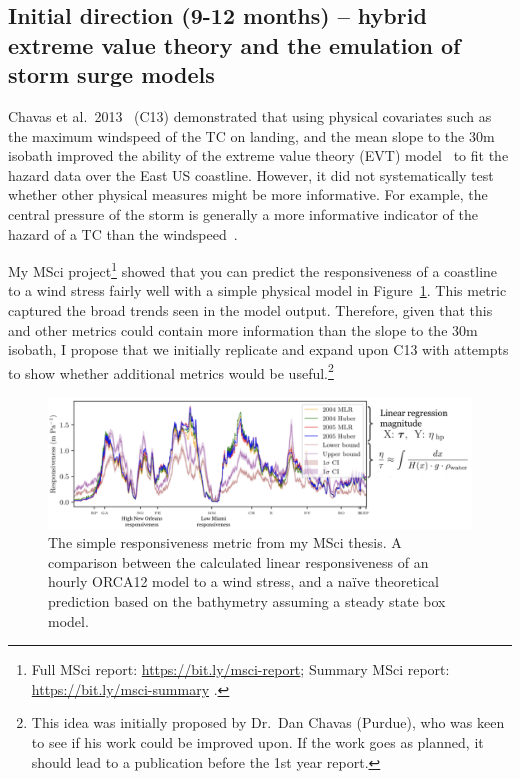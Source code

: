 \documentclass[usenames, dvipsnames]{article}      %
\begin{document}
\subsection*{Initial direction (9-12 months) -- hybrid extreme value theory 
            and the emulation of storm surge models}

\vspace{-10pt}
Chavas et al.~2013~\cite{Chavas2013U.S.Perspective} (C13)
demonstrated that using physical covariates such as
the maximum windspeed of the TC on landing,
and the mean slope to the 30m isobath improved the ability
of the extreme value theory (EVT) model~\cite{coles2001introduction}
to fit the hazard data over the East US coastline.
However, it did not systematically test whether
other physical measures might be more informative.
For example, the central pressure of the storm is generally
a more informative indicator of the hazard of a TC than the windspeed~\cite{Chavas2017PhysicalRelationship}.

 My MSci project\footnote{
 Full MSci report: \url{https://bit.ly/msci-report}; 
 Summary MSci report: \url{https://bit.ly/msci-summary}
 .} 
 showed that you can predict the
 responsiveness of a coastline to a wind stress fairly well with a
 simple physical model in Figure~\ref{fig:responsiveness}.
 This metric captured the broad trends seen in the model output.
 Therefore, given that this and other metrics could contain more
 information than the slope to the 30m isobath, I propose that we
 initially replicate and expand upon C13 with attempts to show whether
 additional metrics would be useful.\footnote{This idea was initially
 proposed by Dr.~Dan Chavas (Purdue), who was keen to see if his work could be
 improved upon. If the work goes as planned, it should lead to a publication before the 1st year report.}

\begin{figure}[htb!]
    \centering
    \includegraphics[width=1.1\linewidth]{img.png}
    \caption{The simple responsiveness metric from my MSci thesis. 
        A comparison between the calculated linear responsiveness
        of an hourly ORCA12 model to a wind stress, 
        and a na\"ive theoretical prediction based on 
        the bathymetry assuming a steady state box model.}
        \vspace{-10pt}
    \label{fig:responsiveness}
\end{figure}
\end{document}
